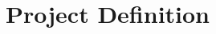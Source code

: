 \documentclass[fleqn,10pt]{SelfArx} %
\affiliation{\textsuperscript{1}\textit{Contact: lucas.nm.breinlinger@bmw.com}} %
\begin{document}
\maketitle %

\tableofcontents %

\thispagestyle{empty} %


\section{Project Definition} %
\end{document}
